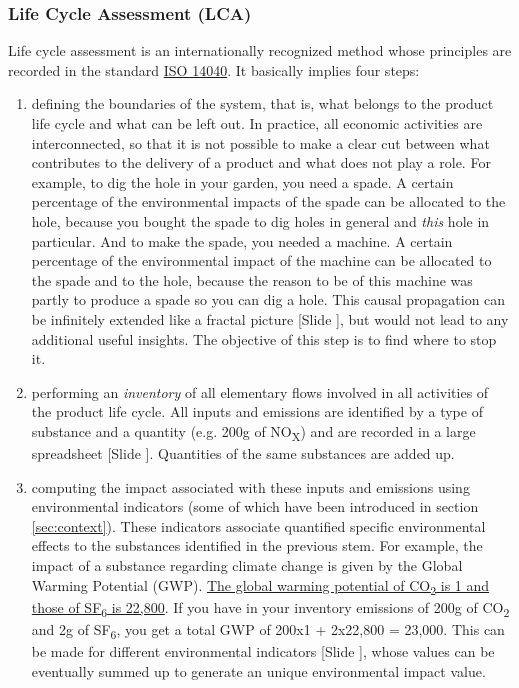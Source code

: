 \documentclass{article}
\newcounter{slide}
\begin{document}
\subsubsection{Life Cycle Assessment (LCA)}
\label{sec:lca}
Life cycle assessment is an internationally recognized method whose principles are recorded in the standard \href{https://www.iso.org/en/standard/37456.html}{ISO 14040}. It basically implies four steps:
\begin{enumerate}
	\item defining the boundaries of the system, that is, what belongs to the product life cycle and what can be left out. In practice, all economic activities are interconnected, so that it is not possible to make a clear cut between what contributes to the delivery of a product and what does not play a role. For example, to dig the hole in your garden, you need a spade. A certain percentage of the environmental impacts of the spade can be allocated to the hole, because you bought the spade to dig holes in general and \emph{this} hole in particular. And to make the spade, you needed a machine. A certain percentage of the environmental impact of the machine can be allocated to the spade and to the hole, because the reason to be of this machine was partly to produce a spade so you can dig a hole. This causal propagation can be infinitely extended like a fractal picture {\color{blue}[Slide ]}, but would not lead to any additional useful insights. The objective of this step is to find where to stop it.
	\item performing an \emph{inventory} of all elementary flows involved in all activities of the product life cycle. All inputs and emissions are identified by a type of substance and a quantity (e.g. 200g of NO\textsubscript{X}) and are recorded in a large spreadsheet {\color{blue}[Slide ]}. Quantities of the same substances are added up. 
	\item computing the impact associated with these inputs and emissions using environmental indicators (some of which have been introduced in section \ref{sec:context}). These indicators associate quantified specific environmental effects to the substances identified in the previous stem. For example, the impact of a substance regarding climate change is given by the Global Warming Potential (GWP). \href{http://www.ghgprotocol.org/sites/default/files/ghgp/Global-Warming-Potential-Values\%20\%28Feb\%2016\%202016\%29_1.pdf}{The global warming potential of CO\textsubscript{2} is 1 and those of SF\textsubscript{6} is 22,800}. If you have in your inventory emissions of 200g of CO\textsubscript{2} and 2g of SF\textsubscript{6}, you get a total GWP of 200x1 + 2x22,800 = 23,000. This can be made for different environmental indicators {\color{blue}[Slide ]}, whose values can be eventually summed up to generate an unique environmental impact value.

\end{enumerate}
\end{document}
